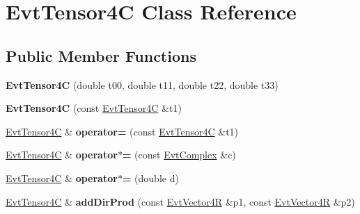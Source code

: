 \hypertarget{class_evt_tensor4_c}{}\section{Evt\+Tensor4\+C Class Reference}
\label{class_evt_tensor4_c}
\subsection*{Public Member Functions}
\begin{DoxyCompactItemize}
\item 
\hypertarget{class_evt_tensor4_c_afc3427ffc6725024831f865a6010fa79}{}{\bfseries Evt\+Tensor4\+C} (double t00, double t11, double t22, double t33)\label{class_evt_tensor4_c_afc3427ffc6725024831f865a6010fa79}

\item 
\hypertarget{class_evt_tensor4_c_a42f2d9f4b5c5e406aca940105debfb1a}{}{\bfseries Evt\+Tensor4\+C} (const \hyperlink{class_evt_tensor4_c}{Evt\+Tensor4\+C} \&t1)\label{class_evt_tensor4_c_a42f2d9f4b5c5e406aca940105debfb1a}

\item 
\hypertarget{class_evt_tensor4_c_a416f66a52d47276e81eb241aff7d2bbb}{}\hyperlink{class_evt_tensor4_c}{Evt\+Tensor4\+C} \& {\bfseries operator=} (const \hyperlink{class_evt_tensor4_c}{Evt\+Tensor4\+C} \&t1)\label{class_evt_tensor4_c_a416f66a52d47276e81eb241aff7d2bbb}

\item 
\hypertarget{class_evt_tensor4_c_aace55745d3f116174952b782c5d768f4}{}\hyperlink{class_evt_tensor4_c}{Evt\+Tensor4\+C} \& {\bfseries operator$\ast$=} (const \hyperlink{class_evt_complex}{Evt\+Complex} \&c)\label{class_evt_tensor4_c_aace55745d3f116174952b782c5d768f4}

\item 
\hypertarget{class_evt_tensor4_c_a65dab0f2257afbdb77664cd3b5e54e52}{}\hyperlink{class_evt_tensor4_c}{Evt\+Tensor4\+C} \& {\bfseries operator$\ast$=} (double d)\label{class_evt_tensor4_c_a65dab0f2257afbdb77664cd3b5e54e52}

\item 
\hypertarget{class_evt_tensor4_c_a920446a7a17609fb178ff30bd0e668a4}{}\hyperlink{class_evt_tensor4_c}{Evt\+Tensor4\+C} \& {\bfseries add\+Dir\+Prod} (const \hyperlink{class_evt_vector4_r}{Evt\+Vector4\+R} \&p1, const \hyperlink{class_evt_vector4_r}{Evt\+Vector4\+R} \&p2)\label{class_evt_tensor4_c_a920446a7a17609fb178ff30bd0e668a4}


\end{DoxyCompactItemize}
